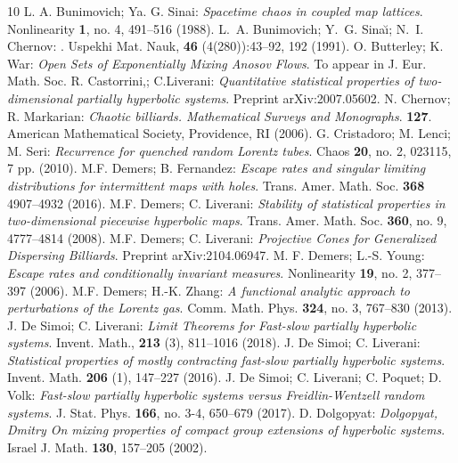 \begin{thebibliography}{10}
 L. A. Bunimovich; Ya. G. Sinai: {\em Spacetime chaos in coupled map lattices}. Nonlinearity {\bf 1}, no. 4, 491--516 (1988).
L.~A. Bunimovich; Y.~G. Sina{\u\i}; N.~I. Chernov:
.
\newblock  Uspekhi Mat. Nauk, {\bf 46} (4(280)):43--92, 192 (1991).
 O. Butterley; K. War: {\em Open Sets of Exponentially Mixing Anosov Flows}. To appear in J. Eur. Math. Soc.
 R. Castorrini,; C.Liverani: {\em Quantitative statistical properties of two-dimensional partially hyperbolic systems}. Preprint arXiv:2007.05602.
 N. Chernov; R. Markarian: {\em Chaotic billiards. Mathematical Surveys and Monographs}. {\bf 127}. American Mathematical Society, Providence, RI (2006).
 G. Cristadoro; M. Lenci; M. Seri: {\em Recurrence for quenched random Lorentz tubes}. Chaos {\bf 20}, no. 2, 023115, 7 pp.  (2010). 
 M.F. Demers; B. Fernandez: {\em Escape rates and singular limiting distributions for intermittent maps with holes}. Trans. Amer. Math. Soc. {\bf 368} 4907--4932 (2016). 
 M.F. Demers; C. Liverani: {\em Stability of statistical properties in two-dimensional piecewise hyperbolic maps}. Trans. Amer. Math. Soc. {\bf 360}, no. 9, 4777--4814 (2008).
 M.F. Demers; C. Liverani: {\em Projective Cones for Generalized Dispersing Billiards}. Preprint arXiv:2104.06947.
 M. F. Demers; L.-S. Young: {\em Escape rates and conditionally invariant measures}. Nonlinearity {\bf 19}, no. 2, 377--397  (2006). 
 M.F. Demers; H.-K. Zhang: {\em A functional analytic approach to perturbations of the Lorentz gas}. Comm. Math. Phys. {\bf 324}, no. 3, 767--830  (2013).
 J. De Simoi; C. Liverani:  {\em Limit Theorems for Fast-slow partially hyperbolic systems}. Invent. Math., {\bf 213} (3), 811--1016 (2018).
 J. De Simoi; C. Liverani:   {\em Statistical properties of mostly contracting fast-slow partially hyperbolic systems}.  Invent. Math. {\bf 206} (1), 147--227 (2016). 
 J. De Simoi; C. Liverani; C. Poquet; D. Volk: {\em Fast-slow partially hyperbolic systems versus Freidlin-Wentzell random systems}. J. Stat. Phys. {\bf 166}, no. 3-4, 650--679 (2017).
 D. Dolgopyat: {\em Dolgopyat, Dmitry On mixing properties of compact group extensions of hyperbolic systems}. Israel J. Math. {\bf 130}, 157--205  (2002).

\end{thebibliography}

